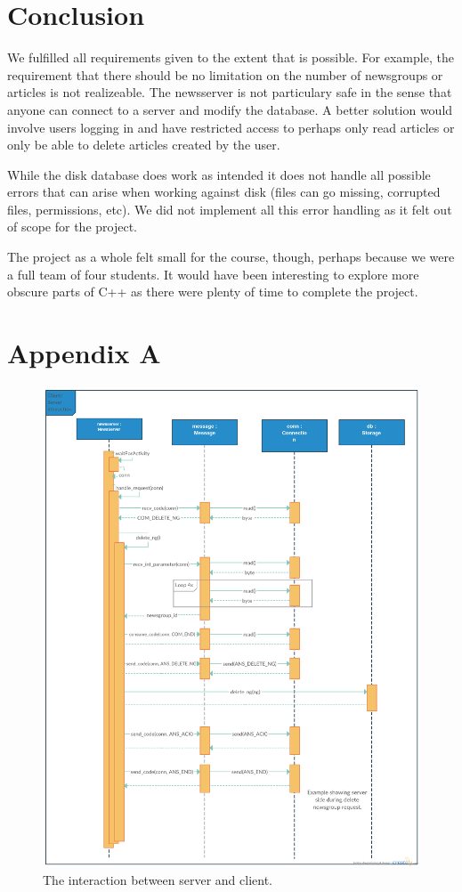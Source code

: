 \documentclass[a4paper]{article}
\begin{document}
\section{Conclusion}
We fulfilled all requirements given to the extent that is possible. For example, the requirement that there should be no limitation on the number of newsgroups or articles is not realizeable. The newsserver is not particulary safe in the sense that anyone can connect to a server and modify the database. A better solution would involve users logging in and have restricted access to perhaps only read articles or only be able to delete articles created by the user.

While the disk database does work as intended it does not handle all possible errors that can arise when working against disk (files can go missing, corrupted files, permissions, etc). We did not implement all this error handling as it felt out of scope for the project.

The project as a whole felt small for the course, though, perhaps because we were a full team of four students. It would have been interesting to explore more obscure parts of C++ as there were plenty of time to complete the project.

\newpage
\section*{Appendix A}


\begin{figure}[!h]
    \centering
    \includegraphics[width=1.1\textwidth]{sequence_uml3.png}
    \caption{The interaction between server and client.}
    \label{fig:sequence}
\end{figure}
\end{document}
